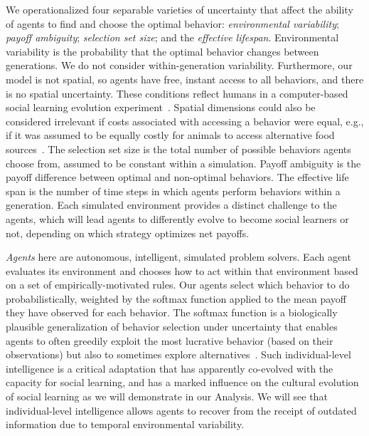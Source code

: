 \documentclass[letterpaper,11.5pt]{scrartcl}
\begin{document}
We operationalized four separable varieties of uncertainty that affect the
ability of agents to find and choose the optimal behavior: 
\emph{environmental variability}; \emph{payoff ambiguity};
\emph{selection set size}; and the \emph{effective lifespan}. Environmental
variability is the probability that the optimal behavior changes
between generations. We do not consider within-generation variability. 
Furthermore, our model is not spatial, so agents have free, instant
access to all behaviors, and there is no spatial uncertainty. 
These conditions reflect humans in a computer-based social learning evolution
experiment~\cite{McElreath2005,Morgan2012,Derex2016}. Spatial dimensions could also be
considered irrelevant if costs associated with accessing a behavior were equal,
e.g., if it was assumed to be equally costly for animals to
access alternative food sources~\cite{Aplin2017,Baracchi2018}.  
The selection set size is the total number of possible
behaviors agents choose from, assumed to be constant within a simulation.  
Payoff ambiguity is the payoff difference between optimal
and non-optimal behaviors. The effective life span is the
number of time steps in which agents perform behaviors within a generation. 
Each simulated environment provides a distinct challenge
to the agents, which will lead agents to differently evolve to become social
learners or not, depending on which strategy optimizes net payoffs.

\emph{Agents} here are autonomous, intelligent, simulated problem solvers. Each
agent evaluates its environment and chooses how to act within that environment based
on a set of empirically-motivated rules.  Our agents select which behavior to do
probabilistically, weighted by the softmax function applied to the mean payoff they
have observed for each behavior. The softmax function is a biologically plausible
generalization of behavior selection under uncertainty that enables agents to often
greedily exploit the most lucrative behavior (based on their observations) but also
to sometimes explore alternatives~\cite{Schulz2019,Collins2013,Daw2006,Yechiam2005}.
Such individual-level intelligence is a critical adaptation that has apparently
co-evolved with the capacity for social learning, and has a marked influence on the
cultural evolution of social learning as we will demonstrate in our Analysis.
We will see that individual-level intelligence allows agents to recover from
the receipt of outdated information due to temporal environmental variability.
\end{document}
